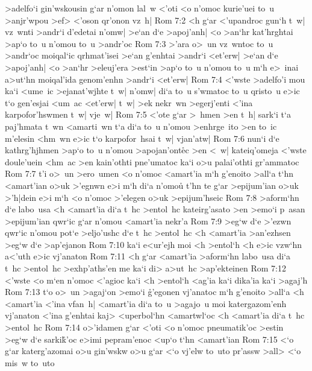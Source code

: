 >adelfo`i
gin'wskousin
g`ar
n'omon
lal~w
<'oti
<o
n'omoc
kurie'uei
to~u
>anjr'wpou
>ef>
<'oson
qr'onon
vz~h|\bibvsend
\vs Rom 7:2
<h
g`ar
<'upandroc
gun`h
t~w|
vz~wnti
>andr`i
d'edetai
n'omw|
>e`an
d`e
>apoj'anh|
<o
>an`hr
kat'hrghtai
>ap`o
to~u
n'omou
to~u
>andr'oc\bibvsend
\vs Rom 7:3
>'ara
o>~un
vz~wntoc
to~u
>andr`oc
moiqal`ic
qrhmat'isei
>e`an
g'enhtai
>andr`i
<et'erw|
>e`an
d`e
>apoj'anh|
<o
>an`hr
>eleuj'era
>est`in
>ap`o
to~u
n'omou
to~u
m`h
e>~inai
a>ut`hn
moiqal'ida
genom'enhn
>andr`i
<et'erw|\bibvsend
\vs Rom 7:4
<'wste
>adelfo'i
mou
ka`i
<ume~ic
>ejanat'wjhte
t~w|
n'omw|
di`a
to~u
s'wmatoc
to~u
qristo~u
e>ic
t`o
gen'esjai
<um~ac
<et'erw|
t~w|
>ek
nekr~wn
>egerj'enti
<'ina
karpofor'hswmen
t~w|
vje~w|\bibvsend
\vs Rom 7:5
<'ote
g`ar
>~hmen
>en
t~h|
sark`i
t`a
paj'hmata
t~wn
<amarti~wn
t`a
di`a
to~u
n'omou
>enhrge~ito
>en
to~ic
m'elesin
<hm~wn
e>ic
t`o
karpofor~hsai
t~w|
vjan'atw|\bibvsend
\vs Rom 7:6
nun`i
d`e
kathrg'hjhmen
>ap`o
to~u
n'omou
>apojan'ont\r{e}c
>en
<~w|
kateiq'omeja
<'wste
doule'uein
<hm~ac
>en
kain'othti
pne'umatoc
ka`i
o>u
palai'othti
gr'ammatoc\bibvsend
\vs Rom 7:7
t'i
o>~un
>ero~umen
<o
n'omoc
<amart'ia
m`h
g'enoito
>all`a
t`hn
<amart'ian
o>uk
>'egnwn
e>i
m`h
di`a
n'omo\r{u}
t'hn
te
g`ar
>epijum'ian
o>uk
>'h|dein
e>i
m`h
<o
n'omoc
>'elegen
o>uk
>epijum'hseic\bibvsend
\vs Rom 7:8
>aform`hn
d`e
labo~usa
<h
<amart'ia
di`a
t~hc
>entol~hc
kateirg'asato
>en
>emo`i
p~asan
>epijum'ian
qwr`ic
g`ar
n'omou
<amart'ia
nekr'a\bibvsend
\vs Rom 7:9
>eg`w
d`e
>'ezwn
qwr`ic
n'omou
pot`e
>eljo'ushc
d`e
t~hc
>entol~hc
<h
<amart'ia
>an'ezhsen
>eg`w
d`e
>ap'ejanon\bibvsend
\vs Rom 7:10
ka`i
e<ur'ejh
moi
<h
>entol`h
<h
e>ic
vzw`hn
a<'uth
e>ic
vj'anaton\bibvsend
\vs Rom 7:11
<h
g`ar
<amart'ia
>aform`hn
labo~usa
di`a
t~hc
>entol~hc
>exhp'aths'en
me
ka`i
di>
a>ut~hc
>ap'ekteinen\bibvsend
\vs Rom 7:12
<'wste
<o
m`en
n'omoc
<'agioc
ka`i
<h
>entol`h
<ag'ia
ka`i
dika'ia
ka`i
>agaj'h\bibvsend
\vs Rom 7:13
t`o
o>~un
>agaj`on
>emo`i
\r{g}'egonen
vj'anatoc
m`h
g'enoito
>all`a
<h
<amart'ia
<'ina
vfan~h|
<amart'ia
di`a
to~u
>agajo~u
moi
katergazom'enh
vj'anaton
<'ina
g'enhtai
kaj>
<uperbol`hn
<amartwl`oc
<h
<amart'ia
di`a
t~hc
>entol~hc\bibvsend
\vs Rom 7:14
o>'idamen
g`ar
<'oti
<o
n'omoc
pneumatik'oc
>estin
>eg`w
d`e
sarki\r{k}'oc
e>imi
pepram'enoc
<up`o
t`hn
<amart'ian\bibvsend
\vs Rom 7:15
<`o
g`ar
katerg'azomai
o>u
gin'wskw
o>u
g`ar
<`o
vj'elw
to~uto
pr'assw
>all>
<`o
mis~w
to~uto
